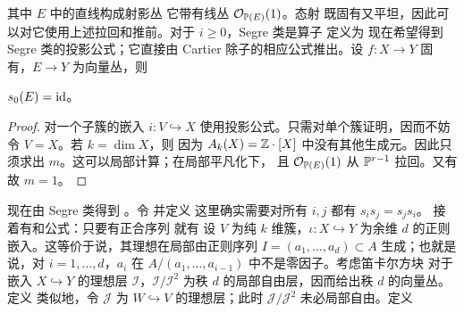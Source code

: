 其中
$E$ 中的直线构成射影丛
它带有线丛 $\mathcal O_{\mathbb P(E)}(1)$。态射
既固有又平坦，因此可以对它使用上述拉回和推前。对于 $i\ge0$，Segre 类是算子
定义为
现在希望得到 Segre 类的投影公式；它直接由 Cartier 除子的相应公式推出。设 $f:X\to Y$ 固有，$E\to Y$ 为向量丛，则
\begin{corollary}\label{cor:3.5}$s_0(E)=\operatorname{id}$。\end{corollary}
\begin{proof}
对一个子簇的嵌入 $i:V\hookrightarrow X$ 使用投影公式。只需对单个簇证明，因而不妨令 $V=X$。若 $k=\dim X$，则
因为 $A_k(X)=\mathbb Z\cdot[X]$ 中没有其他生成元。因此只须求出 $m$。这可以局部计算；在局部平凡化下，
且 $\mathcal O_{\mathbb P(E)}(1)$ 从 $\mathbb P^{r-1}$ 拉回。又有
故 $m=1$。
\end{proof}
现在由 Segre 类得到 。令
并定义
这里确实需要对所有 $i,j$ 都有 $s_is_j=s_js_i$。
接着有和公式：只要有正合序列
就有
设 $V$ 为纯 $k$ 维簇，$\iota:X\hookrightarrow Y$ 为余维 $d$ 的正则嵌入。这等价于说，其理想在局部由正则序列 $I=(a_1,\ldots,a_d)\subset A$ 生成；也就是说，对 $i=1,\ldots,d$，$a_i$ 在 $A/(a_1,\ldots,a_{i-1})$ 中不是零因子。考虑笛卡尔方块
对于嵌入 $X\hookrightarrow Y$ 的理想层 $\mathcal I$，$\mathcal I/\mathcal I^2$ 为秩 $d$ 的局部自由层，因而给出秩 $d$ 的向量丛。定义
类似地，令 $\mathcal J$ 为 $W\hookrightarrow V$ 的理想层；此时 $\mathcal J/\mathcal J^2$ 未必局部自由。定义
